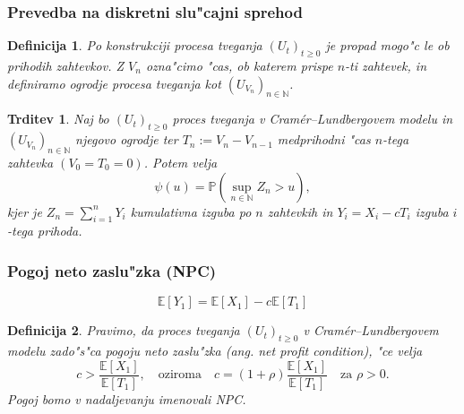 \documentclass[]{beamer} %
\theoremstyle{plain}
\newtheorem{definicija}{Definicija}
\newtheorem{trditev}{Trditev}
\newcommand{\N}{\mathbb{N}}
\newcommand{\E}{\mathbb{E}}
\newcommand{\Prob}{\mathbb{P}}
\begin{document}
\begin{frame}
  \frametitle{Prevedba na diskretni slu"cajni sprehod}
  \begin{definicija}
    Po konstrukciji procesa tveganja $(U_t)_{t\geq0}$ je propad mogo"c le ob 
    prihodih zahtevkov. %
    Z $V_n$ ozna"cimo "cas, ob katerem prispe $n$-ti zahtevek, in definiramo 
    \textit{ogrodje procesa tveganja} kot $(U_{V_n})_{n\in\N}$.
    \label{def:ogrodjeProcesaTveganja}
  \end{definicija}
  \pause
  \begin{trditev}
    Naj bo $(U_t)_{t\geq0}$ proces tveganja v Cramér--Lundbergovem modelu in $(U_{V_n})_{n\in\N}$ 
    njegovo ogrodje ter $T_n := V_n - V_{n-1}$ medprihodni "cas $n$-tega zahtevka 
    $(V_0 = T_0 = 0)$. Potem velja 
    \begin{equation*}
        \psi(u) = \Prob\left(\sup_{n\in\N}Z_n > u\right),
    \end{equation*}
    kjer je $Z_n = \sum_{i=1}^nY_i$  kumulativna izguba po $n$ zahtevkih in $Y_i = X_i - cT_i$
    izguba $i$-tega prihoda.
    \label{trd:verjetnostPropadaZOgrodjem}
  \end{trditev}
\end{frame}

\begin{frame}
  \frametitle{Pogoj neto zaslu"zka (NPC)}
  \begin{equation*}
    \E\left[Y_1\right] = \E\left[X_1\right] - c\E\left[T_1\right]
  \end{equation*}
  \begin{definicija}
    Pravimo, da proces tveganja $(U_t)_{t\geq0}$ v Cramér--Lundbergovem modelu
     zado"s"ca \textit{pogoju neto zaslu"zka} (ang. \textit{net profit condition}), "ce velja 
    \begin{equation*}
        c > \frac{\E\left[X_1\right]}{\E\left[T_1\right]}, \quad \text{oziroma} \quad 
        c = (1 + \rho)\frac{\E\left[X_1\right]}{\E\left[T_1\right]} \quad \text{za $\rho > 0$}.
    \end{equation*}
    Pogoj bomo v nadaljevanju imenovali NPC.
    \label{def:NPC}
  \end{definicija}
\end{frame}
\end{document}
